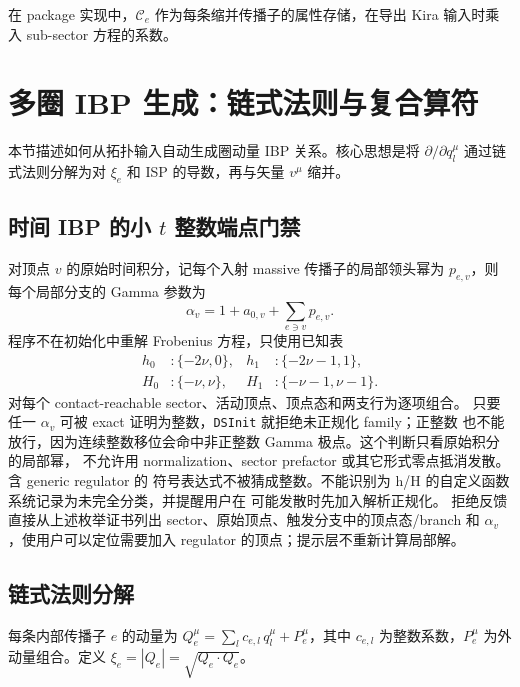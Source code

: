 ﻿\documentclass[a4paper,11pt]{article}
\begin{document}
在 package 实现中，$\mathcal{C}_e$ 作为每条缩并传播子的属性存储，在导出 Kira 输入时乘入 sub-sector 方程的系数。

\section{多圈 IBP 生成：链式法则与复合算符}

本节描述如何从拓扑输入自动生成圈动量 IBP 关系。核心思想是将 $\partial/\partial q_l^\mu$ 通过链式法则分解为对 $\xi_e$ 和 ISP 的导数，再与矢量 $v^\mu$ 缩并。

\subsection{时间 IBP 的小 $t$ 整数端点门禁}

对顶点 $v$ 的原始时间积分，记每个入射 massive 传播子的局部领头幂为
$p_{e,v}$，则每个局部分支的 Gamma 参数为
\begin{equation}
  \alpha_v=1+a_{0,v}+\sum_{e\ni v}p_{e,v}.
\end{equation}
程序不在初始化中重解 Frobenius 方程，只使用已知表
\begin{align}
 h_0 &: \{-2\nu,0\}, & h_1 &: \{-2\nu-1,1\},\\
 H_0 &: \{-\nu,\nu\}, & H_1 &: \{-\nu-1,\nu-1\}.
\end{align}
对每个 contact-reachable sector、活动顶点、顶点态和两支行为逐项组合。
只要任一 $\alpha_v$ 可被 exact 证明为整数，\texttt{DSInit} 就拒绝未正规化 family；正整数
也不能放行，因为连续整数移位会命中非正整数 Gamma 极点。这个判断只看原始积分的局部幂，
不允许用 normalization、sector prefactor 或其它形式零点抵消发散。含 generic regulator 的
符号表达式不被猜成整数。不能识别为 h/H 的自定义函数系统记录为未完全分类，并提醒用户在
可能发散时先加入解析正规化。
拒绝反馈直接从上述枚举证书列出 sector、原始顶点、触发分支中的顶点态/branch 和
$\alpha_v$，使用户可以定位需要加入 regulator 的顶点；提示层不重新计算局部解。

\subsection{链式法则分解}

每条内部传播子 $e$ 的动量为 $Q_e^\mu = \sum_l c_{e,l}\, q_l^\mu + P_e^\mu$，其中 $c_{e,l}$ 为整数系数，$P_e^\mu$ 为外动量组合。定义 $\xi_e = |Q_e| = \sqrt{Q_e \cdot Q_e}$。
\end{document}
